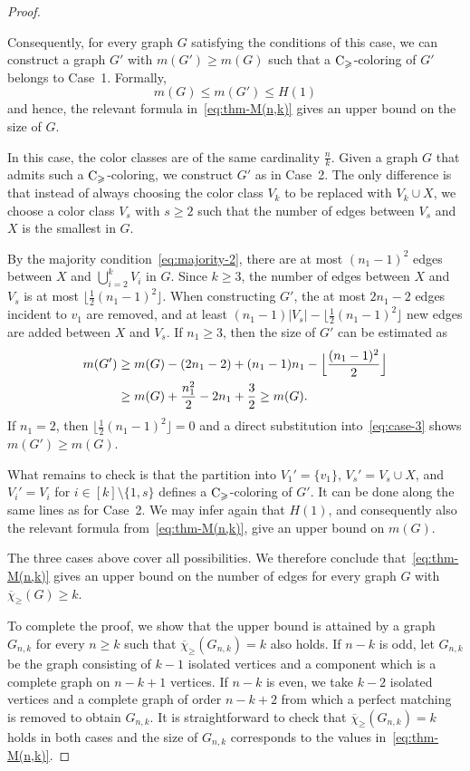 \documentclass{article}
\theoremstyle{definition}
\newcommand{\mc}{\overline{\chi}_{\geqslant}}
\newcommand{\cg}{{\rm C}_{\geqslant}}
\begin{document}
\begin{proof}
\begin{description}
       Consequently, for every graph $G$ satisfying the conditions of this case, we can construct a graph $G'$ with $m(G') \ge m(G)$ such that a $\cg$-coloring of $G'$ belongs to Case~1. Formally,
       $$m(G) \leq m(G') \leq H(1)$$
       and hence, the relevant formula in~\eqref{eq:thm-M(n,k)} gives an upper bound on the size of $G$.
       \item[Case 3. $n_1=\frac{n}{k}$]
       In this case, the color classes are of the same cardinality $\frac{n}{k}$. Given a graph $G$ that admits such a $\cg$-coloring, we construct $G'$ as in Case~2. The only difference is that instead of always choosing the color class $V_k$ to be replaced with $V_k \cup X$, we choose a color class $V_s$ with $s \ge 2$ such that the number of edges between $V_s$ and $X$ is the smallest in $G$. 
       
       By the majority condition~\eqref{eq:majority-2}, there are at most $(n_1-1)^2$ edges between $X$ and $\bigcup_{i=2}^k V_i$ in $G$. Since $k \ge 3$, the number of edges between $X$ and $V_s$ is at most $\lfloor \frac{1}{2} (n_1-1)^2 \rfloor$. When constructing $G'$, the at most $2n_1-2$ edges incident to $v_1$ are removed, and at least
       $(n_1-1)|V_s|- \lfloor \frac{1}{2} (n_1-1)^2 \rfloor$ new edges are added between $X$ and $V_s$. If $n_1 \ge 3$, then the size of $G'$ can be estimated as 
       \begin{align} \label{eq:case-3}
                m(G') &\ge m(G) -(2n_1-2) + (n_1-1)n_1 - \Bigl\lfloor \frac{(n_1-1)^2}{2} \Bigr\rfloor\\
        \nonumber  &\ge m(G) + \frac{n_1^2}{2}-2n_1+\frac{3}{2} \ge m(G).
       \end{align} 
       If $n_1=2$, then $\lfloor \frac{1}{2} (n_1-1)^2 \rfloor=0$ and a direct substitution into~\eqref{eq:case-3} shows $m(G') \ge m(G)$. 

       What remains to check is that the partition into $V_1'=\{v_1\}$, $V_s'= V_s \cup X$, and $V_i'=V_i$ for $i \in [k] \setminus \{1,s\}$ defines a $\cg$-coloring of $G'$. It can be done along the same lines as for Case~2.
       We may infer again that $H(1)$, and consequently also the relevant formula from~\eqref{eq:thm-M(n,k)}, give an upper bound on $m(G)$.
   \end{description}
   The three cases above cover all possibilities. We therefore conclude that~\eqref{eq:thm-M(n,k)} gives an upper bound on the number of edges for every graph $G$ with  $\mc(G) \ge k$. 
   \medskip
   
   To complete the proof, we show that the upper bound is attained by a graph $G_{n,k}$ for every $n \ge k$ such that $\mc(G_{n,k})=k$ also holds. If $n-k$ is odd, let $G_{n,k}$ be the graph consisting of $k-1$ isolated vertices and a component which is a complete graph on $n-k+1$ vertices.  If $n-k$ is even, we take $k-2$ isolated vertices and a complete graph of order $n-k+2$ from which a perfect matching is removed to obtain $G_{n,k}$. It is straightforward to check that $\mc(G_{n,k})=k$ holds in both cases and the size of  $G_{n,k}$ corresponds to the values in~\eqref{eq:thm-M(n,k)}. 
   \end{proof}
\end{document}
